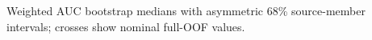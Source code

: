 Weighted AUC bootstrap medians with asymmetric 68\% source-member intervals; crosses show nominal full-OOF values.
